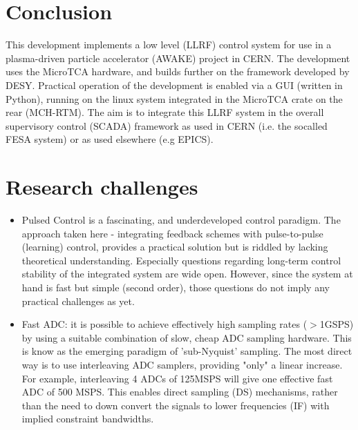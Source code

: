 \documentclass[12pt]{amsart}
\begin{document}
\newpage
{}
\section{Conclusion}

This development implements a low level (LLRF) control system for use in a plasma-driven particle accelerator (AWAKE) project in CERN.
The development uses the MicroTCA hardware, and builds further on the framework developed by DESY.
Practical operation of the development is enabled via a GUI (written in Python), running on the linux system integrated in the MicroTCA crate on the rear 
(MCH-RTM).  The aim is to integrate this LLRF system in the overall supervisory control (SCADA) framework as used in CERN (i.e. the socalled FESA system) 
or as used elsewhere (e.g EPICS).

\section{Research challenges}

\begin{itemize}
\item Pulsed Control is a fascinating, and underdeveloped control paradigm. 
         The approach taken here - integrating feedback schemes with pulse-to-pulse (learning) control,
         provides a practical solution but is riddled by lacking theoretical understanding.
         Especially questions regarding long-term control stability of the integrated system are wide open.
         However, since the system at hand is fast but simple (second order), those questions do not imply any practical challenges as yet. 
          
\item Fast ADC: it is possible to achieve effectively high sampling rates ($>$1GSPS) by using a suitable combination of slow, cheap ADC sampling hardware.
	This is know as the emerging paradigm of 'sub-Nyquist' sampling.
	The most direct way is to use interleaving ADC samplers, providing "only" a linear increase.
	For example, interleaving 4 ADCs of 125MSPS will give one effective fast ADC of 500 MSPS.
	This enables direct sampling (DS) mechanisms, rather than the need to down convert the signals to lower frequencies (IF) with implied constraint bandwidths.
\end{itemize}
\end{document}
